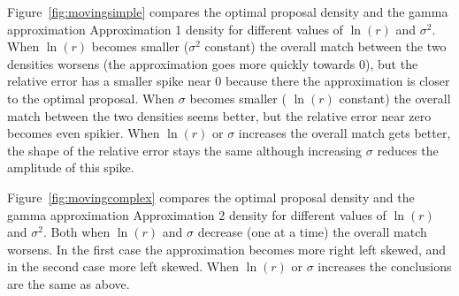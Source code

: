 \documentclass{article}
\begin{document}
Figure~\ref{fig:movingsimple} compares the optimal proposal density and the gamma approximation Approximation 1 density for different values of $\ln(r)$ and $\sigma^2$. When $\ln(r)$ becomes smaller ($\sigma^2$ constant) the overall match between the two densities worsens (the approximation goes more quickly towards 0), but the relative error has a smaller spike near 0 because there the approximation is closer to the optimal proposal. When $\sigma$ becomes smaller ( $\ln(r)$ constant) the overall match between the two densities seems better, but the relative error near zero becomes even spikier. When  $\ln(r)$ or $\sigma$ increases the overall match gets better, the shape of the relative error stays the same although increasing $\sigma$ reduces the amplitude of this spike.

Figure~\ref{fig:movingcomplex} compares the optimal proposal density and the gamma approximation Approximation 2 density for different values of $\ln(r)$ and $\sigma^2$. Both when $\ln(r)$ and $\sigma$ decrease (one at a time) the overall match worsens. In the first case the approximation becomes more right left skewed, and in the second case more left skewed. When  $\ln(r)$ or $\sigma$ increases the conclusions are the same as above.
\end{document}
